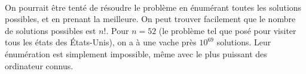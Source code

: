 \documentclass[a4paper]{report}
\begin{document}
\paragraph{}On pourrait être tenté de résoudre le problème en énumérant toutes
les solutions possibles, et en prenant la meilleure. On peut trouver facilement
que le nombre de solutions possibles est \(n!\). Pour \(n=52\) (le problème
tel que posé pour visiter tous les états des États-Unis), on a à une vache près
\(10^{69}\) solutions. Leur énumération est simplement impossible, même avec le
plus puissant des ordinateur connus.
\end{document}

